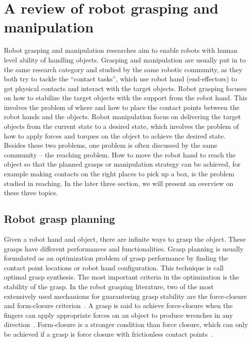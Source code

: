 \section{A review of robot grasping and manipulation}
\label{cha2:sec1:grasping}

Robot grasping and manipulation researches aim to enable robots with human level ability of handling objects. Grasping and manipulation are usually put in to the same research category and studied by the same robotic community, as they both try to tackle the ``contact tasks'', which  use robot hand (end-effectors) to get physical contacts and interact with the target objects.
Robot grasping focuses on how to stabilize the target objects with the support from the robot hand. This involves the problem of where and how to place the contact points between the robot hands and the objects. Robot manipulation focus on delivering the target objects from the current state to a desired state, which involves the problem of how to apply forces and torques on the object to achieve the desired state. Besides these two problems, one problem is often discussed by the same community -- the reaching problem. How to move the robot hand to reach the object so that the planned grasps or manipulation strategy can be achieved, for example making contacts on the right places to pick up a box, is the problem studied in reaching. In the later three section, we will present an overview on these three topics.

\subsection{Robot grasp planning}
\label{cha2:sec1:grasping:planing}

Given a robot hand and object, there are infinite ways to grasp the object. These grasps have different performances and functionalities. Grasp planning is usually formulated as an optimization problem of grasp performance by finding the contact point locations or robot hand configuration. This technique is call optimal grasp synthesis. The most important criteria in the optimization is the stability of the grasp. In the robot grasping literature, two of the most extensively used mechanisms for guaranteeing grasp stability are the force-closure and form-closure criterion~\citep{Nguyen87}. A grasp is said to achieve force-closure when the fingers can apply appropriate forces on an object to produce wrenches in any direction~\citep{SalisburyJr1985}. Form-closure is a stronger condition than force closure, which can only be achieved if a grasp is force closure with frictionless contact points~\citep{diziouglu1984mechanics}.


